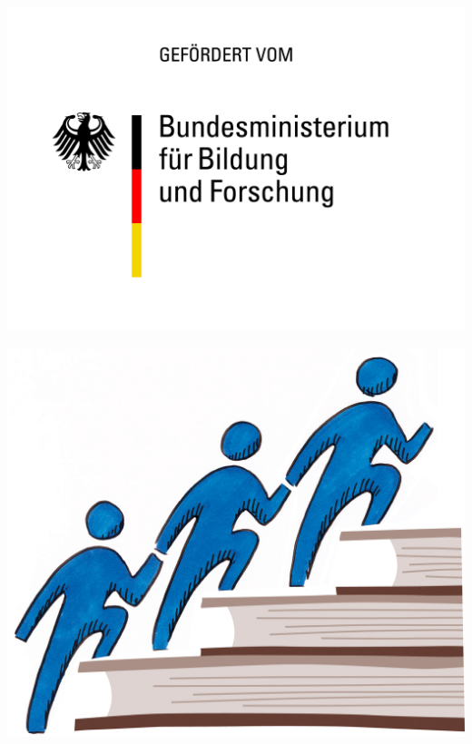 \documentclass[11pt]{book}
\begin{document}
\begin{titlepage}
\begin{center}
\begin{minipage}[cb]{0.1\textwidth}
\includegraphics[width=\textwidth]{grafiken/titel/bmbf.jpg}
\end{minipage}
\begin{minipage}[cb]{0.1\textwidth}
\includegraphics[width=\textwidth]{grafiken/titel/center.jpg}
\end{minipage}
\begin{minipage}[cb]{0.1\textwidth}

\end{minipage}
\end{center}
\end{titlepage}
\end{document}
